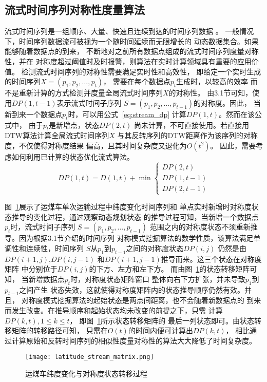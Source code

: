 \subsection{流式时间序列对称性度量算法}
流式时间序列是一组顺序、大量、快速且连续到达的时间序列数据
\cite{DBLP:conf/apweb/KangWWDW18}。
一般情况下，时间序列数据流可被视为一个随时间延续而无限增长的
动态数据集合。如果能够随着数据点的到来，
不断地对之前所有数据点组成的流式时间序列度量对称性，并在
对称度超过阈值时及时报警，则算法在实时计算领域具有重要的应用价值。
检测流式时间序列的对称性需要满足实时性和高效性，
即给定一个实时生成的时间序列$X=(p_1,p_2,\dots,p_t)$，
需要在每个数据点$p_t$生成时，以较高的效率
而不是重新计算的方式检测并度量全局流式时间序列$X$的对称性。
由3.1节可知，使用$DP\left(1,t-1\right)$表示流式时间子序列
$S=(p_1,p_2,\dots,p_{t-1} )$的对称度。因此，
当新到来一个数据点$p_{t}$时，可以用公式~\ref{eq:stream_dp}
计算$DP\left(1,t\right)$。然而在该公式中，
由于$p_{t}$是新增点，状态$DP\left(2,t\right)$
尚未计算，不可直接使用。若直接用DTW算法计算全局流式时间序列$X$
与其反转序列的DTW距离作为该序列的对称度，不仅使得对称度结果
偏高，且其时间复杂度又退化为$O\left(t^2\right)$。
因此，需要考虑如何利用已计算的状态优化流式算法。
\begin{equation}
  DP(1, t)=D(1, t)+\min \left\{\begin{array}{c}
    D P(2, t) \\
    D P(1, t-1) \\
    D P(2, t-1)
    \end{array}\right.
  \label{eq:stream_dp}
\end{equation}

图~\ref{fig:latitude_stream_matrix}展示了运煤车单次运输过程中纬度变化时间序列和
单点实时新增时对称度状态推导的变化过程，通过观察动态规划状态
的推导过程可知，当新增一个数据点$p_t$时，流式时间子序列
$S=\left(p_{1},p_{2},\dots,p_{t-1} \right)$
范围之内的对称度状态不须重新推导。因为根据3.1节介绍的时间序列
对称模式挖掘算法的数学性质，该算法满足单调性和连续性，时间序列
$S$从$p_{1}$到$p_{t-1}$之间的对称度状态$DP\left(i,j\right)$
仍然是由$DP\left(i+1,j\right)$,$DP\left(i,j-1\right)$
和$DP\left(i+1,j-1\right)$推导而来。这三个状态在对称度矩阵
中分别位于$DP\left(i,j\right)$的下方、左方和左下方。
而由图~\ref{fig:latitude_stream_matrix}的状态转移矩阵可知，
当新增数据点$p_t$时，对称度状态矩阵窗口
整体向右下方扩张，并未导致$p_{1}$到$p_{t-1}$之间产生
状态失效，这就使得对称度矩阵内的状态推导顺序仍然有效。并且，
对称度模式挖掘算法的起始状态是两点间距离，也不会随着新数据点的
到来而发生改变。在推导顺序和起始状态均未改变的前提之下，只需
计算$DP\left(k,t\right),1\leq k \leq t$，
即图~\ref{fig:latitude_stream_matrix}所示状态转移矩阵的
最后一列状态即可。由状态转移矩阵的转移路径可知，
只需在$O\left(t\right)$的时间内便可计算出$DP\left(k,t\right)$，
相比通过计算原始和反转时间序列的相似性度量对称性的算法大大降低了时间复杂度。
\begin{figure}
  \centering
  \texttt{[image: latitude\_stream\_matrix.png]}
  \caption{运煤车纬度变化与对称度状态转移过程}
  \label{fig:latitude_stream_matrix}
\end{figure}

